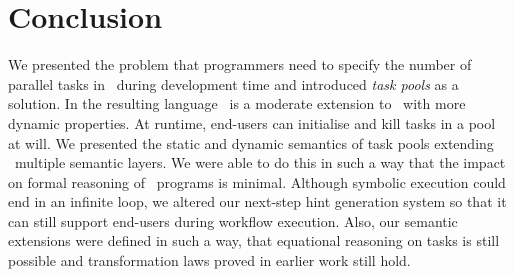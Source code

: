 
\section{Conclusion}
\label{sec:conclusion}

We presented the problem that programmers need to specify the number of parallel tasks in \TOPHAT\ during development time
and introduced \emph{task pools} as a solution.
In the resulting language \DYNTOPHAT\ is a moderate extension to \TOPHAT\ with more dynamic properties.
At runtime, end-users can initialise and kill tasks in a pool at will.
We presented the static and dynamic semantics of task pools extending \TOPHAT\ multiple semantic layers.
We were able to do this in such a way that the impact on formal reasoning of \TOPHAT\ programs is minimal.
Although symbolic execution could end in an infinite loop,
we altered our next-step hint generation system so that it can still support end-users during workflow execution.
Also, our semantic extensions were defined in such a way, that equational reasoning on tasks is still possible
and transformation laws proved in earlier work still hold.


